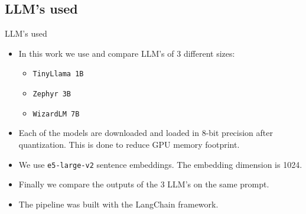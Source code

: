 \documentclass[10pt, t]{beamer}
\begin{document}
    \subsection{LLM's used}
    \begin{frame}{LLM's used}
        \begin{itemize}
            \item In this work we use and compare LLM's of 3 different sizes:
            \begin{itemize}
                \item \texttt{TinyLlama 1B}
                \item \texttt{Zephyr 3B}
                \item \texttt{WizardLM 7B}
            \end{itemize}
            \item Each of the models are downloaded and loaded in 8-bit precision after quantization. This is done to reduce GPU memory footprint.
            \item We use \texttt{e5-large-v2} sentence embeddings. The embedding dimension is 1024.
            \item Finally we compare the outputs of the 3 LLM's on the same prompt.
            \item The pipeline was built with the LangChain framework.
        \end{itemize}
    \end{frame}
\end{document}
